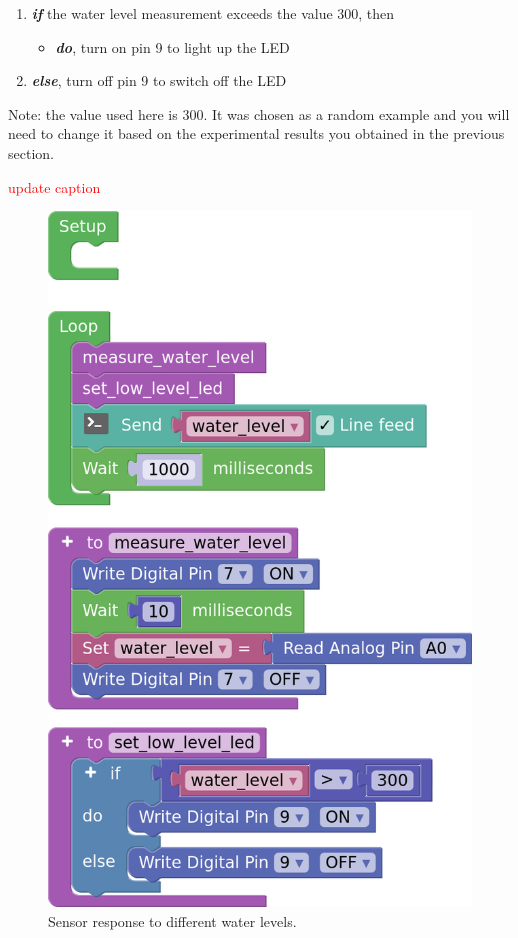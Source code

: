 \documentclass[12pt]{article}
\begin{document}
\begin{enumerate}
	\itemsep -1em
	\item \textbf{\textit{if}} the water level measurement exceeds the value 300, then
	\begin{itemize}
		\item \textbf{\textit{do}}, turn on pin 9 to light up the LED
	\end{itemize}
	\item \textbf{\textit{else}}, turn off pin 9 to switch off the LED
\end{enumerate}

\noindent Note: the value used here is 300. It was chosen as a random example and you will need to change it based on the experimental results you obtained in the previous section.

\textcolor{red}{update caption}

\begin{figure}[H]
	\begin{center}
		\includegraphics[scale=0.3]{p_water-level-sensor_if-else}
		\caption{Sensor response to different water levels.}
		\label{p:water_sensor_if_else}
	\end{center}
\end{figure}
\end{document}
